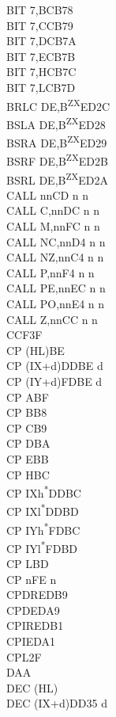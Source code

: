 \documentclass[oneside,a4paper]{book}
\begin{document}
\begin{multicols}{3}
{\begin{tabbing}
BIT 7,B\>CB78\\
BIT 7,C\>CB79\\
BIT 7,D\>CB7A\\
BIT 7,E\>CB7B\\
BIT 7,H\>CB7C\\
BIT 7,L\>CB7D\\
BRLC DE,B\textsuperscript{ZX}\>ED2C\\
BSLA DE,B\textsuperscript{ZX}\>ED28\\
BSRA DE,B\textsuperscript{ZX}\>ED29\\
BSRF DE,B\textsuperscript{ZX}\>ED2B\\
BSRL DE,B\textsuperscript{ZX}\>ED2A\\
CALL nn\>CD n n\\
CALL C,nn\>DC n n\\
CALL M,nn\>FC n n\\
CALL NC,nn\>D4 n n\\
CALL NZ,nn\>C4 n n\\
CALL P,nn\>F4 n n\\
CALL PE,nn\>EC n n\\
CALL PO,nn\>E4 n n\\
CALL Z,nn\>CC n n\\
CCF\>3F\\
CP (HL)\>BE\\
CP (IX+d)\>DDBE d\\
CP (IY+d)\>FDBE d\\
CP A\>BF\\
CP B\>B8\\
CP C\>B9\\
CP D\>BA\\
CP E\>BB\\
CP H\>BC\\
CP IXh\textsuperscript{*}\>DDBC\\
CP IXl\textsuperscript{*}\>DDBD\\
CP IYh\textsuperscript{*}\>FDBC\\
CP IYl\textsuperscript{*}\>FDBD\\
CP L\>BD\\
CP n\>FE n\\
CPDR\>EDB9\\
CPD\>EDA9\\
CPIR\>EDB1\\
CPI\>EDA1\\
CPL\>2F\\
DAA\\
DEC (HL)\\
DEC (IX+d)\>DD35 d\\

\end{tabbing}}
\end{multicols}
\end{document}
